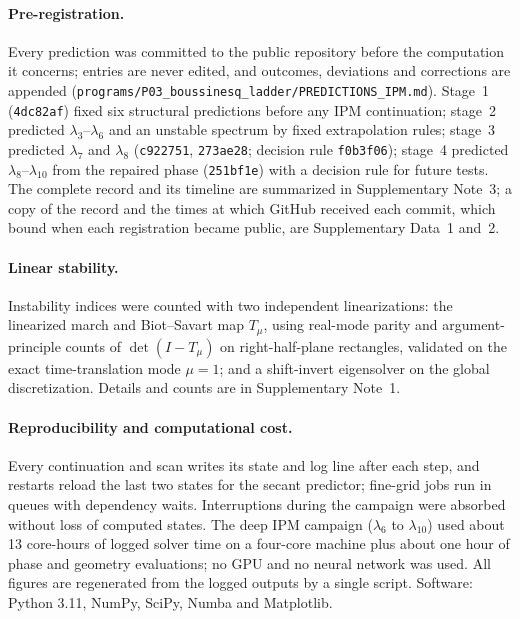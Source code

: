 \documentclass[11pt]{article}
\begin{document}
\paragraph{Pre-registration.} Every prediction was committed to the public repository before the computation it
concerns; entries are never edited, and outcomes, deviations and corrections are appended
(\texttt{programs/P03\_boussinesq\_ladder/PREDICTIONS\_IPM.md}). Stage~1 (\texttt{4dc82af}) fixed six structural
predictions before any IPM continuation; stage~2 predicted $\lambda_3$--$\lambda_6$ and an unstable spectrum by fixed
extrapolation rules; stage~3 predicted $\lambda_7$ and $\lambda_8$ (\texttt{c922751}, \texttt{273ae28}; decision rule
\texttt{f0b3f06}); stage~4 predicted $\lambda_8$--$\lambda_{10}$ from the repaired phase (\texttt{251bf1e}) with a
decision rule for future tests. The complete record and its timeline are summarized in Supplementary Note~3; a copy
of the record and the times at which GitHub received each commit, which bound when each registration became public,
are Supplementary Data~1 and~2.

\paragraph{Linear stability.} Instability indices were counted with two independent linearizations: the linearized
march and Biot--Savart map $T_\mu$, using real-mode parity and argument-principle counts\cite{delves1967} of
$\det(I-T_\mu)$ on right-half-plane rectangles, validated on the exact time-translation mode $\mu=1$; and a
shift-invert eigensolver on the global discretization\cite{kapitula2013}. Details and counts are in Supplementary
Note~1.

\paragraph{Reproducibility and computational cost.} Every continuation and scan writes its state and log line after
each step, and restarts reload the last two states for the secant predictor; fine-grid jobs run in queues with
dependency waits. Interruptions during the campaign were absorbed without loss of computed states. The deep IPM
campaign ($\lambda_6$ to $\lambda_{10}$) used about 13 core-hours of logged solver time on a four-core machine plus
about one hour of phase and geometry evaluations; no GPU and no neural network was used. All figures are regenerated
from the logged outputs by a single script. Software: Python 3.11, NumPy\cite{harris2020}, SciPy\cite{virtanen2020},
Numba\cite{lam2015} and Matplotlib\cite{hunter2007}.
\end{document}
